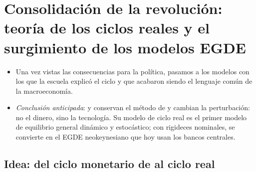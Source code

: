\documentclass[11pt]{article}
\begin{document}
\section{Consolidación de la revolución: teoría de los ciclos reales\cortetitulo{} y el surgimiento de los modelos EGDE}\label{sec:consolidacion}

\begin{itemize}
\item Una vez vistas las consecuencias para la política, pasamos a los modelos con los que la escuela explicó el ciclo y que acabaron siendo el lenguaje común de la macroeconomía.
\item \emph{Conclusión anticipada}:  y  conservan el método de  y cambian la perturbación: no el dinero, sino la tecnología. Su modelo de ciclo real es el primer modelo de equilibrio general dinámico y estocástico; con rigideces nominales, se convierte en el EGDE neokeynesiano que hoy usan los bancos centrales.
\end{itemize}

\subsection{Idea: del ciclo monetario de  al ciclo real}\label{sec:idea-rbc}
\end{document}
